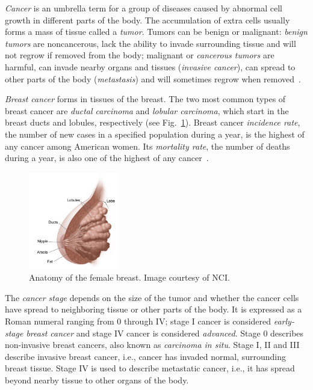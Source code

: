 \emph{Cancer} is an umbrella term for a group of diseases caused by abnormal cell growth in different parts of the body. The accumulation of extra cells usually forms a mass of tissue called a \emph{tumor}. Tumors can be benign or malignant: \emph{benign tumors} are noncancerous, lack the ability to invade surrounding tissue and will not regrow if removed from the body;  malignant or \emph{cancerous tumors} are harmful, can invade nearby organs and tissues (\emph{invasive cancer}), can spread to other parts of the body (\emph{metastasis}) and will sometimes regrow when removed~\cite{WYNTKABreastCancer2012}.

\emph{Breast cancer} forms in tissues of the breast. The two most common types of breast cancer are \emph{ductal carcinoma} and \emph{lobular carcinoma}, which start in the breast ducts and lobules, respectively (see Fig.~\ref{fig:BreastAnatomy}). Breast cancer \emph{incidence rate}, the number of new cases in a specified population during a year, is the highest of any cancer among American women. Its \emph{mortality rate}, the number of deaths during a year, is also one of the highest of any cancer~\cite{Howlader2014}.

\begin{figure}[h]
	\centering
	\includegraphics[width = 0.35\textwidth]{plots/breastAnatomy.png}
	\caption[Anatomy of the female breast]{Anatomy of the female breast. Image courtesy of NCI.}
	\label{fig:BreastAnatomy}
\end{figure}

The \emph{cancer stage} depends on the size of the tumor and whether the cancer cells have spread to neighboring tissue or other parts of the body. It is expressed as a Roman numeral ranging from 0 through IV; stage I cancer is considered \emph{early-stage breast cancer} and stage IV cancer is considered \emph{advanced}. Stage 0 describes non-invasive breast cancers, also known as \emph{carcinoma in situ}. Stage I, II and III describe invasive breast cancer, i.e., cancer has invaded normal, surrounding breast tissue. Stage IV is used to describe metastatic cancer, i.e., it has spread beyond nearby tissue to other organs of the body.

